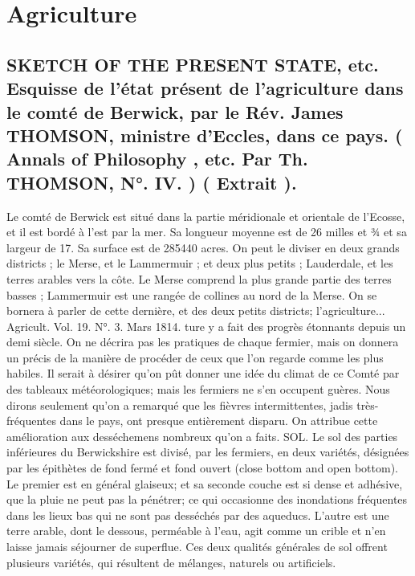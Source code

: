 \setcounter{page}{73}
\chapter{Agriculture}
\section{SKETCH OF THE PRESENT STATE, etc. Esquisse de l'état présent de l'agriculture dans le comté de Berwick, par le Rév. James THOMSON, ministre d'Eccles, dans ce pays. ( Annals of Philosophy , etc. Par Th. THOMSON, N°. IV. ) \large{( Extrait ).}}
Le comté de Berwick est situé dans la partie méridionale et orientale de l'Ecosse, et il est bordé à l'est par la mer. Sa longueur moyenne est de 26 milles et ¾ et sa largeur de 17. Sa surface est de 285440 acres.
On peut le diviser en deux grands districts ; le Merse, et le Lammermuir ; et deux plus petits ; Lauderdale, et les terres arables vers la côte. Le Merse comprend la plus grande partie des terres basses ; Lammermuir est une rangée de collines au nord de la Merse. On se bornera à parler de cette dernière, et des deux petits districts; l'agriculture...
Agricult. Vol. 19. N°. 3. Mars 1814.\setcounter{page}{74} ture y a fait des progrès étonnants depuis un demi siècle. On ne décrira pas les pratiques de chaque fermier, mais on donnera un précis de la manière de procéder de ceux que l'on regarde comme les plus habiles.
Il serait à désirer qu'on pût donner une idée du climat de ce Comté par des tableaux météorologiques; mais les fermiers ne s'en occupent guères. Nous dirons seulement qu'on a remarqué que les fièvres intermittentes, jadis très-fréquentes dans le pays, ont presque entièrement disparu. On attribue cette amélioration aux desséchemens nombreux qu'on a faits.
SOL. Le sol des parties inférieures du Berwickshire est divisé, par les fermiers, en deux variétés, désignées par les épithètes de fond fermé et fond ouvert (close bottom and open bottom). Le premier est en général glaiseux; et sa seconde couche est si dense et adhésive, que la pluie ne peut pas la pénétrer; ce qui occasionne des inondations fréquentes dans les lieux bas qui ne sont pas desséchés par des aqueducs. L'autre est une terre arable, dont le dessous, perméable à l'eau, agit comme un crible et n'en laisse jamais séjourner de superflue. Ces deux qualités générales de sol offrent plusieurs variétés, qui résultent de mélanges, naturels ou artificiels.\setcounter{page}{75}
